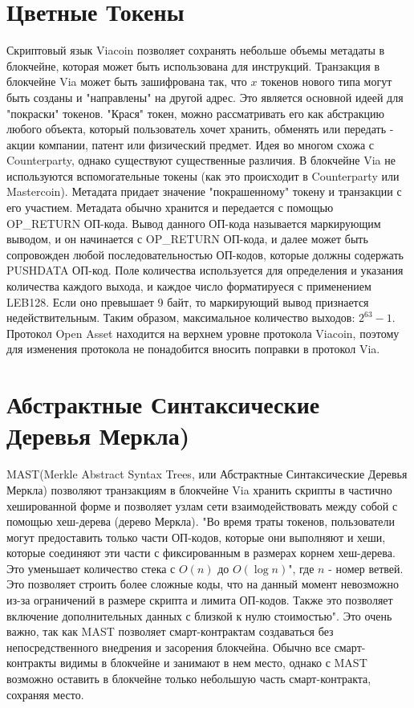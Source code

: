 \documentclass{article}
\begin{document}
\section{Цветные Токены}\label{Colored coins}
Скриптовый язык Viacoin позволяет сохранять небольше объемы метадаты в блокчейне, которая может быть использована для инструкций. Транзакция в блокчейне Via может быть зашифрована так, что $x$ токенов нового типа могут быть созданы и "направлены" на другой адрес. Это является основной идеей для "покраски" токенов.
"Крася" токен, можно рассматривать его как абстракцию любого объекта, который пользователь хочет хранить, обменять или передать - акции компании, патент или физический предмет. Идея во многом схожа с Counterparty, однако существуют существенные различия.
\newline \newline \noindent
В блокчейне Via не используются вспомогательные токены (как это происходит в Counterparty или Mastercoin). Метадата придает значение "покрашенному" токену\cite{coloredCoins} и транзакции с его участием. Метадата обычно хранится и передается с помощью OP\_RETURN ОП-кода. Вывод данного ОП-кода называется маркирующим выводом, и он начинается с OP\_RETURN ОП-кода, и далее может быть сопровожден любой последовательностью ОП-кодов, которые должны содержать PUSHDATA ОП-код.
Поле количества используется для определения и указания количества каждого выхода, и каждое число форматируеся с применением LEB128. Если оно превышает 9 байт, то маркирующий вывод признается недействительным. Таким образом, максимальное количество выходов: $2^{63} - 1$.
Протокол \cite{openAsset}Open Asset находится на верхнем уровне протокола Viacoin, поэтому для изменения протокола не понадобится вносить поправки в протокол Via.

\section{Абстрактные Синтаксические Деревья Меркла)} \label{MAST (Merkelized Abstract Syntax Trees)}
\cite{MAST} MAST(Merkle Abstract Syntax Trees, или Абстрактные Синтаксические Деревья Меркла) позволяют транзакциям в блокчейне Via хранить скрипты в частично хешированной форме и позволяет узлам сети взаимодействовать между собой с помощью хеш-дерева (дерево Меркла).
"Во время траты токенов, пользователи могут предоставить только части ОП-кодов, которые они выполняют и хеши, которые соединяют эти части с фиксированным в размерах корнем хеш-дерева. Это уменьшает количество стека с $O(n)$ до $O(\log{}n)$", где $n$ - номер ветвей. Это позволяет строить более сложные коды, что на данный момент невозможно из-за ограничений в размере скрипта и лимита ОП-кодов. Также это позволяет включение дополнительных данных с близкой к нулю стоимостью".  \newline \newline \noindent
Это очень важно, так как MAST позволяет смарт-контрактам создаваться без непосредственного внедрения и засорения блокчейна. Обычно все смарт-контракты видимы в блокчейне и занимают в нем место, однако с MAST возможно оставить в блокчейне только небольшую часть смарт-контракта, сохраняя место.
\end{document}
